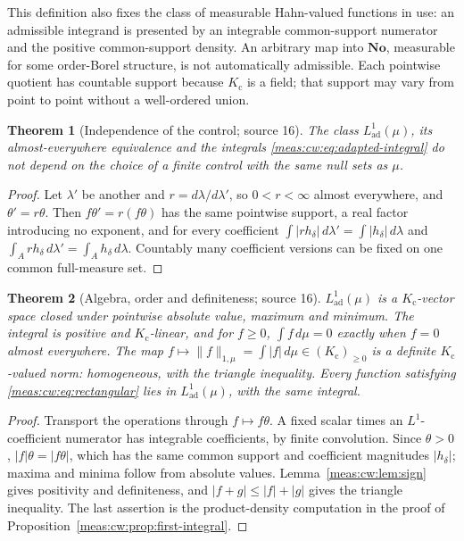 \documentclass[11pt]{article}
\numberwithin{equation}{section}
\newtheorem{theorem}{Theorem}[section]
\theoremstyle{definition}
\theoremstyle{remark}
\newcommand{\No}{\mathbf{No}}
\newcommand{\norm}[1]{\lVert#1\rVert}
\newcommand{\abs}[1]{\lvert#1\rvert}
\newcommand{\Kc}{K_{\mathrm c}}
\newcommand{\Lad}{L^1_{\mathrm{ad}}}
\begin{document}
This definition also fixes the class of measurable Hahn-valued functions in
use: an admissible integrand is presented by an integrable common-support
numerator and the positive common-support density. An arbitrary map into $\No$,
measurable for some order-Borel structure, is not automatically admissible.
Each pointwise quotient has countable support because $\Kc$ is a field; that
support may vary from point to point without a well-ordered union.

\begin{theorem}[Independence of the control; source 16]
\label{meas:cw:thm:control-invariant}
The class $\Lad(\mu)$, its almost-everywhere equivalence and the integrals
\eqref{meas:cw:eq:adapted-integral} do not depend on the choice of a finite
control with the same null sets as $\mu$.
\end{theorem}
\begin{proof}
Let $\lambda'$ be another and $r=d\lambda/d\lambda'$, so $0<r<\infty$ almost
everywhere, and $\theta'=r\theta$. Then $f\theta'=r(f\theta)$ has the same pointwise
support, a real factor introducing no exponent, and for every coefficient
$\int\abs{rh_\delta}\,d\lambda'=\int\abs{h_\delta}\,d\lambda$ and
$\int_Arh_\delta\,d\lambda'=\int_Ah_\delta\,d\lambda$. Countably many coefficient
versions can be fixed on one common full-measure set.
\end{proof}

\begin{theorem}[Algebra, order and definiteness; source 16]
\label{meas:cw:thm:integral-properties}
$\Lad(\mu)$ is a $\Kc$-vector space closed under pointwise absolute value,
maximum and minimum. The integral is positive and $\Kc$-linear, and for $f\ge0$,
$\int f\,d\mu=0$ exactly when $f=0$ almost everywhere. The map
$f\mapsto\norm f_{1,\mu}=\int\abs f\,d\mu\in(\Kc)_{\ge0}$ is a definite
$\Kc$-valued norm: homogeneous, with the triangle inequality. Every function
satisfying \eqref{meas:cw:eq:rectangular} lies in $\Lad(\mu)$, with the same
integral.
\end{theorem}
\begin{proof}
Transport the operations through $f\mapsto f\theta$. A fixed scalar times an
$L^1$-coefficient numerator has integrable coefficients, by finite
convolution. Since $\theta>0$, $\abs f\theta=\abs{f\theta}$, which has the same
common support and coefficient magnitudes $\abs{h_\delta}$; maxima and minima
follow from absolute values. Lemma~\ref{meas:cw:lem:sign} gives positivity and
definiteness, and $\abs{f+g}\le\abs f+\abs g$ gives the triangle inequality. The
last assertion is the product-density computation in the proof of
Proposition~\ref{meas:cw:prop:first-integral}.
\end{proof}
\end{document}
